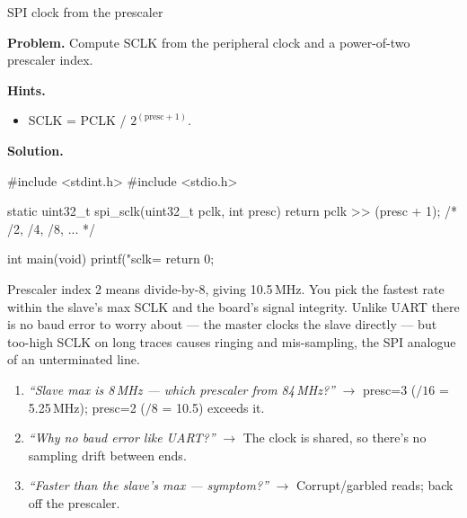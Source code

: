 \begin{gymproblem}{SPI clock from the prescaler}

\textbf{Problem.} Compute SCLK from the peripheral clock and a power-of-two
prescaler index.

\textbf{Hints.}
\begin{itemize}
\item SCLK = PCLK / $2^{(\text{presc}+1)}$.
\end{itemize}

\attempt

\textbf{Solution.}
\begin{cgym}
#include <stdint.h>
#include <stdio.h>

static uint32_t spi_sclk(uint32_t pclk, int presc) {
    return pclk >> (presc + 1);     /* /2, /4, /8, ... */
}

int main(void) {
    printf("sclk=%
    return 0;
}
\end{cgym}

Prescaler index 2 means divide-by-8, giving 10.5\,MHz. You pick the fastest rate
within the slave's max SCLK and the board's signal integrity. Unlike UART there
is no baud error to worry about --- the master clocks the slave directly --- but
too-high SCLK on long traces causes ringing and mis-sampling, the SPI analogue
of an unterminated line.

\followups
\begin{enumerate}
\item \emph{``Slave max is 8\,MHz --- which prescaler from 84\,MHz?''}
  $\rightarrow$ presc=3 ($/16$ = 5.25\,MHz); presc=2 ($/8$ = 10.5) exceeds it.
\item \emph{``Why no baud error like UART?''} $\rightarrow$ The clock is shared,
  so there's no sampling drift between ends.
\item \emph{``Faster than the slave's max --- symptom?''} $\rightarrow$
  Corrupt/garbled reads; back off the prescaler.
\end{enumerate}
\end{gymproblem}

